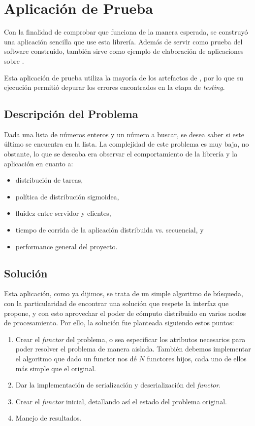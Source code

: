 \chapter{Aplicación de Prueba \label{chap:dummy_application}}
Con la finalidad de comprobar que \rc{} funciona de la manera esperada, se construyó una aplicación sencilla que use
esta librería. Además
de servir como prueba del software construido, también sirve como ejemplo de elaboración de aplicaciones sobre \rc.

Esta aplicación de prueba utiliza la mayoría de los artefactos de \rc, por lo que su ejecución permitió depurar los errores encontrados en
la etapa de \textit{testing}.

\section{Descripción del Problema}
\label{app_desc_problem}

Dada una lista de números enteros y un número a buscar, se desea saber si este último se encuentra en la lista. La complejidad de este
problema es muy baja, no obstante, lo que se deseaba era observar el comportamiento de la librería y la aplicación en cuanto a:
\begin{itemize}
    \item   distribución de tareas,
    \item   política de distribución sigmoidea,
    \item   fluidez entre servidor y clientes,
    \item   tiempo de corrida de la aplicación distribuida vs. secuencial, y
    \item   performance general del proyecto.
\end{itemize}


\section{Solución}

Esta aplicación, como ya dijimos, se trata de un simple algoritmo de búsqueda, con la particularidad de encontrar una solución que respete
la interfaz que \rc{} propone, y con esto aprovechar el poder de cómputo distribuido en varios nodos de procesamiento. Por ello, la solución
fue planteada siguiendo estos puntos:
\begin{enumerate}
    \item   Crear el \textit{functor} del problema, o sea especificar los atributos necesarios para poder resolver el problema de manera
            aislada. También debemos implementar el algoritmo que dado un functor nos dé $N$ functores hijos, cada uno de ellos más simple
            que el original.
    \item   Dar la implementación de serialización y deserialización del \textit{functor}.
    \item   Crear el \textit{functor} inicial, detallando así el estado del problema original.
    \item   Manejo de resultados.
\end{enumerate}

